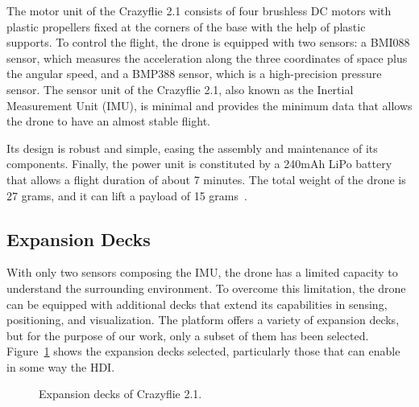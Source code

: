 The motor unit of the Crazyflie 2.1 consists of four brushless DC motors with plastic propellers fixed at the corners of the base with the help of plastic supports.
To control the flight, the drone is equipped with two sensors: a BMI088 sensor, which measures the acceleration along the three coordinates of space plus the angular speed, 
and a BMP388 sensor, which is a high-precision pressure sensor.
The sensor unit of the Crazyflie 2.1, also known as the Inertial Measurement Unit (IMU), is minimal and provides the minimum data that allows the drone to have an almost stable flight.

Its design is robust and simple, easing the assembly and maintenance of its components.
Finally, the power unit is constituted by a 240mAh LiPo battery that allows a flight duration of about 7 minutes. 
The total weight of the drone is 27 grams, and it can lift a payload of 15 grams~\cite{crazyflie}. 


\subsection{Expansion Decks}\label{subsec:expansion_decks}
With only two sensors composing the IMU, the drone has a limited capacity to understand the surrounding environment. 
To overcome this limitation, the drone can be equipped with additional decks that extend its capabilities in sensing, positioning, and visualization.
The platform offers a variety of expansion decks, but for the purpose of our work, only a subset of them has been selected.
Figure~\ref{fig:decks} shows the expansion decks selected, particularly those that can enable in some way the HDI.

\begin{figure}[tb]
    \centering
    \quad
    \quad
    \quad
    \quad
    \caption{Expansion decks of Crazyflie 2.1.}\label{fig:decks}
\end{figure}



